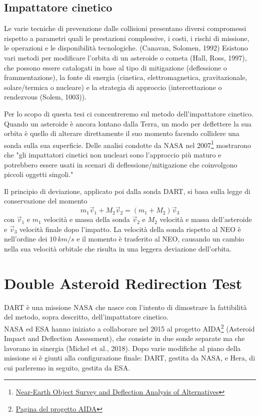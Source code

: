 \documentclass[a4paper,11pt,openright]{book}
\begin{document}
\subsection{Impattatore cinetico}
Le varie tecniche di prevenzione dalle collisioni presentano diversi compromessi rispetto a parametri quali le prestazioni complessive, i costi, i rischi di missione, le operazioni e le disponibilità tecnologiche. (Canavan, Solomen, 1992) Esistono vari metodi per modificare l'orbita di un asteroide o cometa (Hall, Ross, 1997), che possono essere catalogati in base al tipo di mitigazione (deflessione o frammentazione), la fonte di energia (cinetica, elettromagnetica, gravitazionale, solare/termica o nucleare) e la strategia di approccio (intercettazione o rendezvous (Solem, 1003)).

Per lo scopo di questa tesi ci concentreremo sul metodo dell'impattatore cinetico.\\
Quando un asteroide è ancora lontano dalla Terra, un modo per deflettere la sua orbita è quello di alterare direttamente il suo momento facendo collidere una sonda sulla sua superficie. Delle analisi condotte da NASA nel 2007\footnote{\href{https://web.archive.org/web/20160305101217/http://neo.jpl.nasa.gov/neo/report2007.html}{Near-Earth Object Survey and Deflection Analysis of Alternatives}} mostrarono che "gli impattatori cinetici non nucleari sono l'approccio più maturo e potrebbero essere usati in scenari di deflessione/mitigazione che coinvolgono piccoli oggetti singoli."

Il principio di deviazione, applicato poi dalla sonda DART, si basa sulla legge di conservazione del momento
\begin{equation}
    m_1 \vec{v}_1 + M_2\vec{v}_2 = (m_1+M_2)\vec{v}_3
\end{equation}
con $\vec{v}_1$ e $m_1$ velocità e massa della sonda $\vec{v}_2$ e $M_2$ velocità e massa dell'asteroide e $\vec{v}_3$ velocità finale dopo l'impatto. 
La velocità della sonda rispetto al NEO è nell'ordine dei $10\,km/s$ e il momento è trasferito al NEO, causando un cambio nella sua velocità orbitale che risulta in una leggera deviazione dell'orbita.

\section{Double Asteroid Redirection Test}\label{sec:DART}
DART è una missione NASA che nasce con l'intento di dimostrare la fattibilità del metodo, sopra descritto, dell'impattatore cinetico.\\
NASA ed ESA hanno iniziato a collaborare nel 2015 al progetto AIDA\footnote{\href{https://www.esa.int/Space_Safety/Hera/Asteroid_Impact_Deflection_Assessment_AIDA_collaboration}{Pagina del progetto AIDA}} (Asteroid Impact and Deflection Assessment), che consiste in due sonde separate ma che lavorano in sinergia (Michel et al., 2018). Dopo varie modifiche al piano della missione si è giunti alla configurazione finale: DART, gestita da NASA, e Hera, di cui parleremo in seguito, gestita da ESA.
\end{document}
